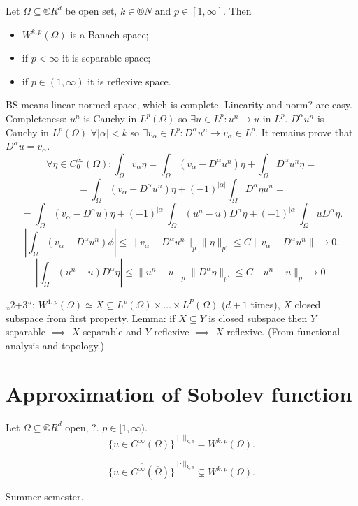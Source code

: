 \documentclass[12pt]{article}					%
\begin{document}
\begin{veta}
	Let $\Omega \subseteq ®R^d$ be open set, $k \in ®N$ and $p \in [1, ∞]$. Then

	\begin{itemize}
		\item $W^{k, p}(\Omega)$ is a Banach space;
		\item if $p < ∞$ it is separable space;
		\item if $p \in (1, ∞)$ it is reflexive space.
	\end{itemize}

	\begin{dukazin}
		BS means linear normed space, which is complete. Linearity and norm? are easy. Completeness: $u^n$ is Cauchy in $L^p(\Omega)$ so $\exists u \in L^p: u^n \rightarrow u$ in $L^p$. $D^\alpha u^n$ is Cauchy in $L^p(\Omega)$ $\forall |\alpha| < k$ so $\exists v_\alpha \in L^p: D^\alpha u^n \rightarrow v_\alpha \in L^p$. It remains prove that $D^\alpha u = v_\alpha$.
		$$ \forall \eta \in C_0^∞(\Omega): \int_\Omega v_\alpha \eta = \int_\Omega (v_\alpha - D^\alpha u^n)\eta + \int_\Omega D^{\alpha}u^n\eta = $$
		$$ = \int_\Omega(v_\alpha - D^\alpha u^n) \eta + (-1)^{|\alpha|} \int_\Omega D^\alpha \eta u^n = $$
		$$ = \int_\Omega(v_\alpha - D^\alpha u) \eta + (-1)^{|\alpha|} \int_\Omega(u^n - u)D^\alpha\eta + (-1)^{|\alpha|}\int_\Omega u D^\alpha \eta. $$
		$$ \left|\int_\Omega (v_\alpha - D^\alpha u^n) \phi\right| ≤ \|v_\alpha - D^\alpha u^n\|_p \|\eta\|_{p'} ≤ C \|v_\alpha - D^\alpha u^n\| \rightarrow 0. $$
		$$ \left|\int_\Omega (u^n - u) D^\alpha \eta\right| ≤ \|u^n - u\|_p \|D^\alpha \eta\|_{p'} ≤ C \|u^n - u\|_p \rightarrow 0. $$

		„2+3“: $W^{1, p}(\Omega) \simeq X \subseteq L^p(\Omega) \times … \times L^P(\Omega)$ ($d+1$ times), $X$ closed subspace from first property. Lemma: if $X \subseteq Y$ is closed subspace then $Y$ separable $\implies$ $X$ separable and $Y$ reflexive $\implies$ $X$ reflexive. (From functional analysis and topology.)
	\end{dukazin}
\end{veta}

\section{Approximation of Sobolev function}
\begin{veta}
	Let $\Omega \subseteq ®R^d$ open, ?. $p \in [1, ∞)$.
	$$ \overline{\{u \in C^∞(\Omega)\}}^{||·||_{k, p}} = W^{k, p}(\Omega). $$

	\begin{upozorneni}
		$$ \overline{\{u \in C^∞(\overline{\Omega})\}}^{||·||_{k, p}} \subsetneq W^{k, p}(\Omega). $$
	\end{upozorneni}

	\begin{dukazin}
		Summer semester.
	\end{dukazin}
\end{veta}
\end{document}
